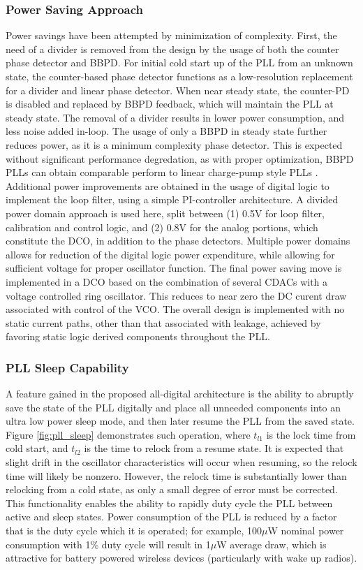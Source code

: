 	\subsubsection{Power Saving Approach}
	Power savings have been attempted by minimization of complexity. First, the need of a divider is removed from the design by the usage of both the counter phase detector and BBPD. For initial cold start up of the PLL from an unknown state, the counter-based phase detector functions as a low-resolution replacement for a divider and linear phase detector. When near steady state, the counter-PD is disabled and replaced by BBPD feedback, which will maintain the PLL at steady state. The removal of a divider results in lower power consumption, and less noise added in-loop. The usage of only a BBPD in steady state further reduces power, as it is a minimum complexity phase detector. This is expected without significant performance degredation, as with proper optimization, BBPD PLLs can obtain comparable perform to linear charge-pump style PLLs \cite{xu_abidi_2017}. Additional power improvements are obtained in the usage of digital logic to implement the loop filter, using a simple PI-controller architecture. A divided power domain approach is used here, split between (1) 0.5V for loop filter, calibration and control logic, and (2) 0.8V for the analog portions, which constitute the DCO, in addition to the phase detectors. Multiple power domains allows for reduction of the digital logic power expenditure, while allowing for sufficient voltage for proper oscillator function. The final power saving move is implemented in a DCO based on the combination of several CDACs with a voltage controlled ring oscillator. This reduces to near zero the DC curent draw associated with control of the VCO. The overall design is implemented with no static current paths, other than that associated with leakage, achieved by favoring static logic derived components throughout the PLL.

	\subsubsection{PLL Sleep Capability}
	A feature gained in the proposed all-digital architecture is the ability to abruptly save the state of the PLL digitally and place all unneeded components into an ultra low power sleep mode, and then later resume the PLL from the saved state. Figure \ref{fig:pll_sleep} demonstrates such operation, where $t_{l1}$ is the lock time from cold start, and $t_{l2}$ is the time to relock from a resume state. It is expected that slight drift in the oscillator characteristics will occur when resuming, so the relock time will likely be nonzero. However, the relock time is substantially lower than relocking from a cold state, as only a small degree of error must be corrected. This functionality enables the ability to rapidly duty cycle the PLL between active and sleep states. Power consumption of the PLL is reduced by a factor that is the duty cycle which it is operated; for example, 100$\mu$W nominal power consumption with 1\% duty cycle will result in 1$\mu$W average draw, which is attractive for battery powered wireless devices (particularly with wake up radios).

